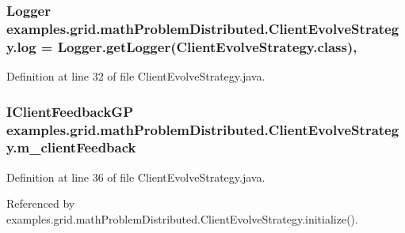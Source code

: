 \hypertarget{classexamples_1_1grid_1_1math_problem_distributed_1_1_client_evolve_strategy_ab9dbd30db73c004ae43e231238c85308}{
\subsubsection[{log}]{\setlength{\rightskip}{0pt plus 5cm}Logger examples.\-grid.\-math\-Problem\-Distributed.\-Client\-Evolve\-Strategy.\-log = Logger.\-get\-Logger(Client\-Evolve\-Strategy.\-class)\hspace{0.3cm}{\ttfamily [static]}, {\ttfamily [private]}}}\label{classexamples_1_1grid_1_1math_problem_distributed_1_1_client_evolve_strategy_ab9dbd30db73c004ae43e231238c85308}


Definition at line 32 of file Client\-Evolve\-Strategy.\-java.

\hypertarget{classexamples_1_1grid_1_1math_problem_distributed_1_1_client_evolve_strategy_ae48b9c70ed4cbd0fc93c7ac650ec0b8a}{
\subsubsection[{m\-\_\-client\-Feedback}]{\setlength{\rightskip}{0pt plus 5cm}I\-Client\-Feedback\-G\-P examples.\-grid.\-math\-Problem\-Distributed.\-Client\-Evolve\-Strategy.\-m\-\_\-client\-Feedback\hspace{0.3cm}{\ttfamily [private]}}}\label{classexamples_1_1grid_1_1math_problem_distributed_1_1_client_evolve_strategy_ae48b9c70ed4cbd0fc93c7ac650ec0b8a}


Definition at line 36 of file Client\-Evolve\-Strategy.\-java.



Referenced by examples.\-grid.\-math\-Problem\-Distributed.\-Client\-Evolve\-Strategy.\-initialize().

